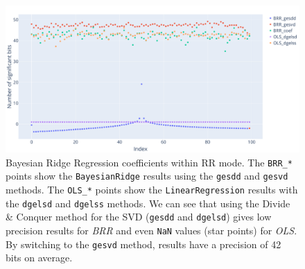\documentclass[11pt]{article}
\begin{document}
\begin{figure}
    \centering
    \includegraphics[width=\linewidth]{figure/BRR/BRR_coefs_sig.pdf}
    \caption{Bayesian Ridge Regression coefficients within RR mode.
    The \texttt{BRR\_*} points show the \texttt{BayesianRidge} results
    using the \texttt{gesdd} and \texttt{gesvd} methods. 
    The \texttt{OLS\_*} points show the \texttt{LinearRegression} results
    with the \texttt{dgelsd} and \texttt{dgelss} methods.
    We can see that using the Divide \& Conquer method for the SVD
    (\texttt{gesdd} and  \texttt{dgelsd})
    gives low precision
    results for \textit{BRR} and even \texttt{NaN} values (star points) for \textit{OLS}. By switching to the \texttt{gesvd} method, 
    results have a precision of 42 bits on average.
    }
    \label{fig:brr_svd_sig}
\end{figure}



\end{document}
